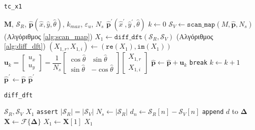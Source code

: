 \begin{algorithm}[!h]
  \caption{\texttt{tc\_x1}}
  \label{alg:icte}
  \begin{spacing}{1.4}
    \begin{algorithmic}[1]
      \REQUIRE $\bm{M}$, $\mathcal{S}_R$, $\hat{\bm{p}}(\hat{x}, \hat{y}, \hat{\theta})$, $k_{max}$, $\varepsilon_u$, $N_s$
      \ENSURE $\hat{\bm{p}}^\prime(\hat{x}^{\prime}, \hat{y}^{\prime}, \hat{\theta})$
      \STATE $k \leftarrow 0$
      \STATE $\mathcal{S}_V \leftarrow \texttt{scan\_map}(M, \hat{\bm{p}}, N_s)$ \hfill (Αλγόριθμος \ref{alg:scan_map})
      \STATE $X_1 \leftarrow \texttt{diff\_dft}(\mathcal{S}_R, \mathcal{S}_V)$ \hfill (Αλγόριθμος \ref{alg:diff_dft})
      \STATE $(X_{1,r}, X_{1,i}) \leftarrow (\texttt{re}(X_1), \texttt{im}(X_1))$
      \STATE $\bm{u}_k = \begin{bmatrix}
              u_x \\ u_y
             \end{bmatrix}
             =
             \dfrac{1}{N_s}
             \begin{bmatrix}
               \cos\hat{\theta} & \sin\hat{\theta} \\
               \sin\hat{\theta} & -\cos\hat{\theta}
             \end{bmatrix}
             \begin{bmatrix}
               X_{1,r} \\ X_{1,i}
             \end{bmatrix}
             $
      \STATE $\hat{\bm{p}}\leftarrow \hat{\bm{p}}+ \bm{u}_k$
        \STATE \texttt{break}
      \ENDIF
      \STATE $k \leftarrow k + 1$
      \ENDWHILE
      \STATE $\hat{\bm{p}}^\prime \leftarrow \hat{\bm{p}}$
      \RETURN $\hat{\bm{p}}^\prime$
    \end{algorithmic}
  \end{spacing}
\end{algorithm}

\begin{algorithm}[!h]
  \caption{\texttt{diff\_dft}}
  \label{alg:diff_dft}
  \begin{spacing}{1.3}
    \begin{algorithmic}[1]
      \REQUIRE $\mathcal{S}_R, \mathcal{S}_V$
      \ENSURE $X_1$
      \STATE \texttt{assert} $|\mathcal{S}_R| = |\mathcal{S}_V|$
      \STATE $N_s \leftarrow |\mathcal{S}_R|$
      \STATE {$\bm{\Delta} \leftarrow \{\varnothing\}$}
      \STATE $d_n \leftarrow \mathcal{S}_R[n] - \mathcal{S}_V[n]$
      \STATE \texttt{append} $d$ to $\bm{\Delta}$
      \ENDFOR
      \STATE $\bm{X} \leftarrow \mathcal{F}\{\bm{\Delta}\}$
      \STATE $X_1 \leftarrow \bm{X}[1]$
      \RETURN $X_1$
    \end{algorithmic}
  \end{spacing}
\end{algorithm}


